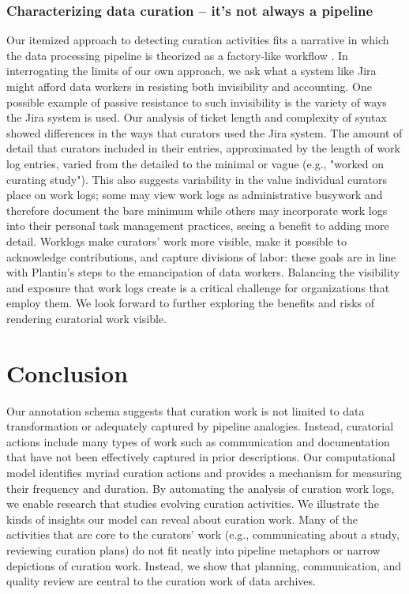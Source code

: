 \documentclass[conference]{IEEEtran}
\begin{document}
\subsubsection{Characterizing data curation – it’s not always a pipeline}
\label{characterizing-data-curation}
Our itemized approach to detecting curation activities fits a narrative in which the data processing pipeline is theorized as a factory-like workflow \cite{Plantin2021-hl}. In interrogating the limits of our own approach, we ask what a system like Jira might afford data workers in resisting both invisibility and accounting. One possible example of passive resistance to such invisibility is the variety of ways the Jira system is used. Our analysis of ticket length and complexity of syntax showed differences in the ways that curators used the Jira system. The amount of detail that curators included in their entries, approximated by the length of work log entries, varied from the detailed to the minimal or vague (e.g., "worked on curating study"). This also suggests variability in the value individual curators place on work logs; some may view work logs as administrative busywork and therefore document the bare minimum while others may incorporate work logs into their personal task management practices, seeing a benefit to adding more detail. Worklogs make curators’ work more visible, make it possible to acknowledge contributions, and capture divisions of labor: these goals are in line with Plantin’s \cite{Plantin2021-hl} steps to the emancipation of data workers. Balancing the visibility and exposure that work logs create is a critical challenge for organizations that employ them. We look forward to further exploring the benefits and risks of rendering curatorial work visible.

\section{Conclusion}
Our annotation schema suggests that curation work is not limited to data transformation or adequately captured by pipeline analogies. Instead, curatorial actions include many types of work such as communication and documentation that have not been effectively captured in prior descriptions. Our computational model identifies myriad curation actions and provides a mechanism for measuring their frequency and duration. By automating the analysis of curation work logs, we enable research that studies evolving curation activities. We illustrate the kinds of insights our model can reveal about curation work. Many of the activities that are core to the curators’ work (e.g., communicating about a study, reviewing curation plans) do not fit neatly into pipeline metaphors or narrow depictions of curation work. Instead, we show that planning, communication, and quality review are central to the curation work of data archives.
\end{document}
